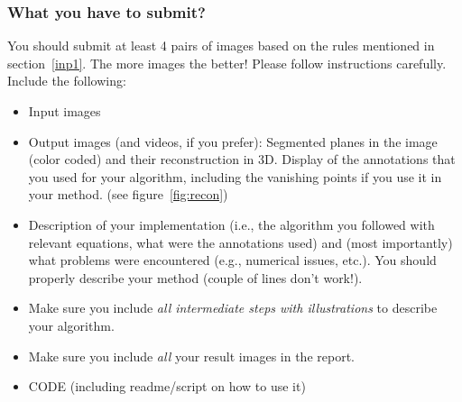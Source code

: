 \documentclass[11pt]{article}
\begin{document}
\subsubsection{What you have to submit?}
\label{sec:tosubmit}
You should submit at least 4 pairs of images based on the rules mentioned in section~\ref{inp1}. The more images the better! Please follow instructions carefully. Include the following:
\begin{itemize}
\item Input images
\item Output images (and videos, if you prefer): Segmented planes in the image (color coded) and their reconstruction in 3D. Display of the annotations that you used for your algorithm, including the vanishing points if you use it in your method. (see figure~\ref{fig:recon})
\item Description of your implementation (i.e., the algorithm you followed with relevant equations,
what were the annotations used) and (most importantly) what problems were encountered (e.g., numerical issues, etc.). You should properly describe your method (couple of lines don't work!).
\item Make sure you include {\it all intermediate steps with illustrations} to describe your algorithm.
\item Make sure you include {\it all} your result images in the report.
\item CODE (including readme/script on how to use it)
\end{itemize}
\end{document}
